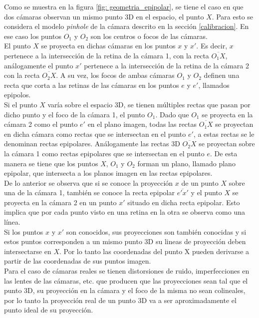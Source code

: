  Como se muestra en la figura \ref{fig: geometria_epipolar}, se tiene el caso en que dos cámaras observan un mismo punto 3D en el espacio, el punto $X$. Para esto se considera el modelo \textit{pinhole} de la cámara  descrito en la sección \ref{calibracion}. En ese caso los puntos $O_1$ y $O_2$ son los centros o focos de las cámaras.\\
 
  El punto $X$ se proyecta en dichas cámaras en los puntos $x$ y $x'$. Es decir, $x$ pertenece a la intersección de la retina de la cámara 1, con la recta $\overline{O_1X}$, análogamente el punto $x'$ pertenece a la intersección de la retina de la cámara 2 con la recta $\overline{O_2X}$. A su vez, los focos de ambas cámaras $O_1$ y $O_2$ definen una recta que corta a las retinas de las cámaras en los puntos $e$ y $e'$, llamados epipolos.\\
  
  Si el punto $X$ varía sobre el espacio 3D, se tienen múltiples rectas que pasan por dicho punto y el foco de la cámara 1, el punto $O_1$. Dado que $O_1$ se proyecta en la cámara 2 como el punto $e'$ en el plano imagen, todas las rectas  $\overline{O_1X}$ se proyectan en dicha cámara como rectas que se intersectan en el punto $e'$, a estas rectas se le denominan rectas epipolares. Análogamente las rectas 3D $\overline{O_2X}$ se proyectan sobre la cámara 1 como rectas epipolares que se intersectan en el punto $e$. De esta manera se tiene que los puntos $X$, $O_1$ y $O_2$ forman un plano, llamado plano epipolar,  que intersecta a los planos imagen en las rectas epipolares.\\
  
De lo anterior se observa que si se conoce la proyección $x$ de un punto $X$ sobre una de la cámara 1, también se conoce la recta epipolar $\overline{e'x'}$ y el punto $X$ se proyecta en la cámara 2 en un punto $x'$ situado en dicha recta epipolar. Esto implica que por cada punto visto en una retina en la otra se observa como una línea.\\
 
Si los puntos $x$ y $x'$ son conocidos, sus proyecciones son también conocidas y si estos puntos corresponden a un mismo punto 3D su lineas de proyección deben intersectarse en $X$. Por lo tanto las coordenadas del punto X pueden derivarse a partir de las coordenadas de sus puntos imagen.\\
 
Para el caso de cámaras reales se tienen distorsiones de ruido, imperfecciones en las lentes de las cámaras, etc. que producen que las proyecciones sean tal que el punto 3D, su proyección en la cámara y el foco de la misma no sean colineales, por lo tanto la proyección real de un punto 3D va a ser aproximadamente el punto ideal de su proyección. \\

